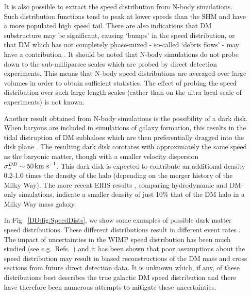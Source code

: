 It is also possible to extract the speed distribution from N-body simulations. Such distribution functions tend \cite{Vogelsberger:2009, Kuhlen:2010, Mao:2012} to peak at lower speeds than the SHM and have a more populated high speed tail. There are also indications that DM substructure may be significant, causing `bumps' in the speed distribution, or that DM which has not completely phase-mixed - so-called `debris flows' - may have a contribution \cite{Kuhlen:2012}.  It should be noted that N-body simulations do not probe down to the sub-milliparsec scales which are probed by direct detection experiments. This means that N-body speed distributions are averaged over large volumes in order to obtain sufficient statistics. The effect of probing the speed distribution over such large length scales (rather than on the ultra local scale of experiments) is not known. 

Another result obtained from N-body simulations is the possibility of a dark disk. When baryons are included in simulations of galaxy formation, this results in the tidal distruption of DM subhaloes which are then preferentially dragged into the disk plane \cite{Read:2009, Read:2010}. The resulting dark disk corotates with approximately the same speed as the baryonic matter, though with a smaller velocity dispersion $\sigma_v^{DD} \sim 50 \,\textrm{km s}^{-1}$. This dark disk is expected to contribute an additional density 0.2-1.0 times the density of the halo (depending on the merger history of the Milky Way). The more recent ERIS results \cite{Pillepich:2014}, comparing hydrodynamic and DM-only simulations, indicate a smaller density of just 10\% that of the DM halo in a Milky Way mass galaxy.


In Fig.~\ref{DD:fig:SpeedDists}, we show some examples of possible dark matter speed distributions.  These different distributions result in different event rates . The impact of uncertainties in the WIMP speed distribution has been much studied (see e.g.\ Refs.~\cite{Green:2010, Peter:2011, Fairbairn:2012}) and it has been shown that poor assumptions about the speed distribution may result in biased reconstructions of the DM mass and cross sections from future direct detection data.  It is unknown which, if any, of these distributions best describes the true galactic DM speed distribution and there have therefore been numerous attempts to mitigate these uncertainties.


